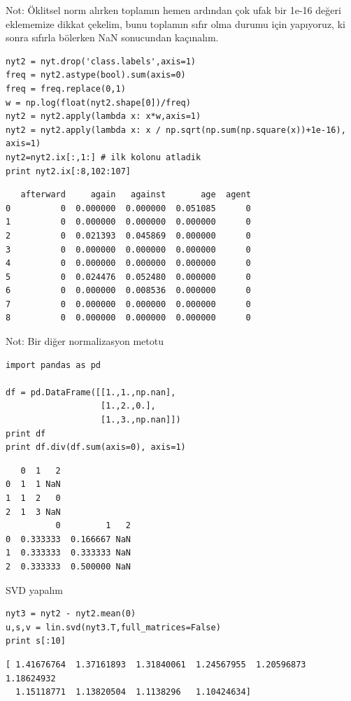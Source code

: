 \documentclass[12pt,fleqn]{article}\usepackage{../../common}
\begin{document}
Not: Öklitsel norm alırken toplamın hemen ardından çok ufak bir 1e-16
değeri eklememize dikkat çekelim, bunu toplamın sıfır olma durumu için
yapıyoruz, ki sonra sıfırla bölerken NaN sonucundan kaçınalım. 

\begin{verbatim}
nyt2 = nyt.drop('class.labels',axis=1)
freq = nyt2.astype(bool).sum(axis=0)
freq = freq.replace(0,1)
w = np.log(float(nyt2.shape[0])/freq)
nyt2 = nyt2.apply(lambda x: x*w,axis=1)
nyt2 = nyt2.apply(lambda x: x / np.sqrt(np.sum(np.square(x))+1e-16), axis=1)
nyt2=nyt2.ix[:,1:] # ilk kolonu atladik
print nyt2.ix[:8,102:107]
\end{verbatim}

\begin{verbatim}
   afterward     again   against       age  agent
0          0  0.000000  0.000000  0.051085      0
1          0  0.000000  0.000000  0.000000      0
2          0  0.021393  0.045869  0.000000      0
3          0  0.000000  0.000000  0.000000      0
4          0  0.000000  0.000000  0.000000      0
5          0  0.024476  0.052480  0.000000      0
6          0  0.000000  0.008536  0.000000      0
7          0  0.000000  0.000000  0.000000      0
8          0  0.000000  0.000000  0.000000      0
\end{verbatim}

Not: Bir diğer normalizasyon metotu

\begin{verbatim}
import pandas as pd

df = pd.DataFrame([[1.,1.,np.nan],
                   [1.,2.,0.],
                   [1.,3.,np.nan]])
print df
print df.div(df.sum(axis=0), axis=1)
\end{verbatim}

\begin{verbatim}
   0  1   2
0  1  1 NaN
1  1  2   0
2  1  3 NaN
          0         1   2
0  0.333333  0.166667 NaN
1  0.333333  0.333333 NaN
2  0.333333  0.500000 NaN
\end{verbatim}

SVD yapalım

\begin{verbatim}
nyt3 = nyt2 - nyt2.mean(0)
u,s,v = lin.svd(nyt3.T,full_matrices=False)
print s[:10]
\end{verbatim}

\begin{verbatim}
[ 1.41676764  1.37161893  1.31840061  1.24567955  1.20596873  1.18624932
  1.15118771  1.13820504  1.1138296   1.10424634]
\end{verbatim}
\end{document}
